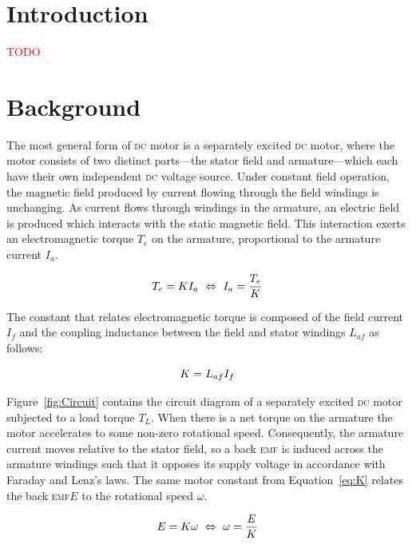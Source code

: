 \documentclass[a4paper,10pt]{article}
\newcommand{\DC}{\textsc{dc}\xspace}
\newcommand{\EMF}{\textsc{emf}\xspace}
\begin{document}
\section{Introduction}

\textcolor{red}{TODO}

\section{Background}

The most general form of \DC motor is a separately excited \DC motor, where the 
motor consists of two distinct parts---the stator field and armature---which 
each have their own independent \DC voltage source. Under constant field 
operation, the magnetic field produced by current flowing through the field 
windings is unchanging. As current flows through windings in the armature, an 
electric field is produced which interacts with the static magnetic field. This 
interaction exerts an electromagnetic torque $T_e$ on the armature, 
proportional to the armature current $I_a$.

\begin{equation}  \label{eq:T}
    T_e = K I_a ~\Leftrightarrow~ I_a = \frac{T_e}{K} \\
\end{equation}

The constant that relates electromagnetic torque is composed of the field 
current $I_f$ and the coupling inductance between the field and stator windings 
$L_{af}$ as follows:

\begin{equation} \label{eq:K}
    K = L_{af} I_f \\
\end{equation}

Figure~\vref{fig:Circuit} contains the circuit diagram of a separately excited 
\DC motor subjected to a load torque $T_L$. When there is a net torque on the 
armature the motor accelerates to some non-zero rotational speed. Consequently, 
the armature current moves relative to the stator field, so a back \EMF is 
induced across the armature windings such that it opposes its supply voltage in 
accordance with Faraday and Lenz's laws. The same motor constant from 
Equation~\ref{eq:K} relates the back \EMF $E$ to the rotational speed $\omega$.

\begin{equation}  \label{eq:omega}
    E = K \omega ~\Leftrightarrow~ \omega = \frac{E}{K} \\
\end{equation}
\end{document}
